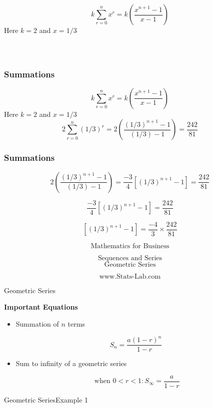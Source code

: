 \[ k  \sum^{n}_{r=0} x^r  =  k \left( \frac{x^{n+1}-1}{x-1} \right) \]
Here $k=2$ and $x = 1/3$ 
\[  \phantom{ 2  \sum^{n}_{r=0} (1/3)^r  =  2 \left( \frac{(1/3)^{n+1}-1}{(1/3)-1} \right) } \]




\frametitle{Summations}


\[ k  \sum^{n}_{r=0} x^r  =  k \left( \frac{x^{n+1}-1}{x-1} \right) \]
Here $k=2$ and $x = 1/3$ 
\[  2  \sum^{n}_{r=0} (1/3)^r  =  2 \left( \frac{(1/3)^{n+1}-1}{(1/3)-1} \right)  = \frac{242}{81} \]




\frametitle{Summations}

\[    2 \left( \frac{(1/3)^{n+1}-1}{(1/3)-1} \right)  = \frac{-3}{4} \left[ (1/3)^{n+1}-1 \right]  = \frac{242}{81} \]

\[     \frac{-3}{4} \left[ (1/3)^{n+1}-1 \right]  = \frac{242}{81} \]

\[      \left[ (1/3)^{n+1}-1 \right]  =  \frac{-4}{3} \times \frac{242}{81} \]





\huge
\[ \mbox{ Mathematics for Business  }  \]

\[ \mbox{ Sequences and Series  }  \]
\[ \mbox{ Geometric Series   }  \]

\[ \mbox{ www.Stats-Lab.com
  }  \]




{Geometric Series}

\textbf{Important Equations}
\begin{itemize}
\item Summation of $n$ terms
{

\[ S_n = \frac{a(1-r)^n}{1-r} \]
}
\item Sum to infinity of a geometric series
{

\[ \mbox{ when } 0 < r < 1 : S_{\infty} = \frac{a}{1-r} \]
}
\end{itemize}


{Geometric Series}{Example 1}



